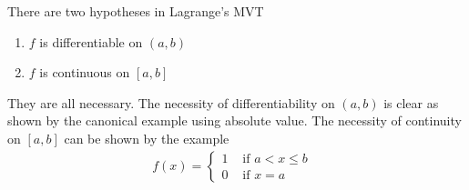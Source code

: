 \documentclass{report}
\begin{document}
\begin{mdframed}
There are two hypotheses in Lagrange's MVT 
\begin{enumerate}[label=(\alph*)]
  \item $f$ is differentiable on $(a,b)$ 
  \item $f$ is continuous on $[a,b]$
\end{enumerate}
They are all necessary. The necessity of differentiability on $(a,b)$ is clear as shown by the canonical example using absolute value. The necessity of continuity on $[a,b]$ can be shown by the example 
\begin{align*}
f(x)=\begin{cases}
  1& \text{ if $a<x\leq b$ }\\
  0& \text{ if  }x=a
\end{cases}
\end{align*}
\end{mdframed}
\end{document}
